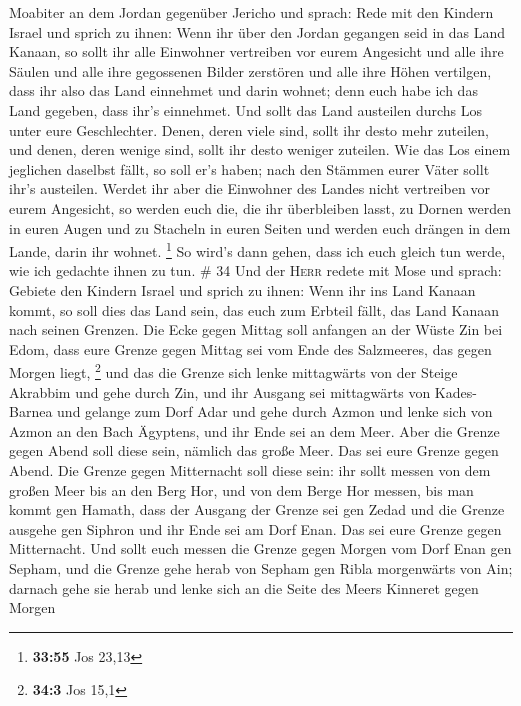 Moabiter an dem Jordan gegenüber Jericho und sprach: 
Rede mit den Kindern Israel und sprich zu ihnen: Wenn ihr über den
Jordan gegangen seid in das Land Kanaan,  so sollt ihr
alle Einwohner vertreiben vor eurem Angesicht und alle ihre Säulen und
alle ihre gegossenen Bilder zerstören und alle ihre Höhen vertilgen,
 dass ihr also das Land einnehmet und darin wohnet; denn
euch habe ich das Land gegeben, dass ihr's einnehmet. 
Und sollt das Land austeilen durchs Los unter eure Geschlechter. Denen,
deren viele sind, sollt ihr desto mehr zuteilen, und denen, deren wenige
sind, sollt ihr desto weniger zuteilen. Wie das Los einem jeglichen
daselbst fällt, so soll er's haben; nach den Stämmen eurer Väter sollt
ihr's austeilen.  Werdet ihr aber die Einwohner des
Landes nicht vertreiben vor eurem Angesicht, so werden euch die, die ihr
überbleiben lasst, zu Dornen werden in euren Augen und zu Stacheln in
euren Seiten und werden euch drängen in dem Lande, darin ihr wohnet.
\footnote{\textbf{33:55} Jos 23,13}  So wird's dann
gehen, dass ich euch gleich tun werde, wie ich gedachte ihnen zu tun. \#
34  Und der \textsc{Herr} redete mit Mose und sprach:
 Gebiete den Kindern Israel und sprich zu ihnen: Wenn ihr
ins Land Kanaan kommt, so soll dies das Land sein, das euch zum Erbteil
fällt, das Land Kanaan nach seinen Grenzen.  Die Ecke
gegen Mittag soll anfangen an der Wüste Zin bei Edom, dass eure Grenze
gegen Mittag sei vom Ende des Salzmeeres, das gegen Morgen liegt,
\footnote{\textbf{34:3} Jos 15,1}  und das die Grenze sich
lenke mittagwärts von der Steige Akrabbim und gehe durch Zin, und ihr
Ausgang sei mittagwärts von Kades-Barnea und gelange zum Dorf Adar und
gehe durch Azmon  und lenke sich von Azmon an den Bach
Ägyptens, und ihr Ende sei an dem Meer.  Aber die Grenze
gegen Abend soll diese sein, nämlich das große Meer. Das sei eure Grenze
gegen Abend.  Die Grenze gegen Mitternacht soll diese
sein: ihr sollt messen von dem großen Meer bis an den Berg Hor,
 und von dem Berge Hor messen, bis man kommt gen Hamath,
dass der Ausgang der Grenze sei gen Zedad  und die Grenze
ausgehe gen Siphron und ihr Ende sei am Dorf Enan. Das sei eure Grenze
gegen Mitternacht.  Und sollt euch messen die Grenze
gegen Morgen vom Dorf Enan gen Sepham,  und die Grenze
gehe herab von Sepham gen Ribla morgenwärts von Ain; darnach gehe sie
herab und lenke sich an die Seite des Meers Kinneret gegen Morgen

